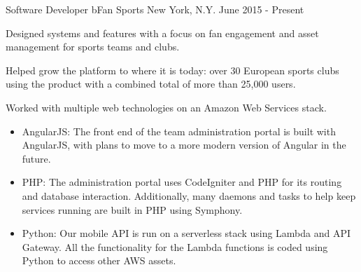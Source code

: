 

\begin{cventries}

  \cventry
    {Software Developer} %
    {bFan Sports} %
    {New York, N.Y.} %
    {June 2015 - Present} %
    {
      \begin{cvitems} %
        \item {Designed systems and features with a focus on fan engagement and asset management for sports teams and clubs.}
        \item {Helped grow the platform to where it is today: over 30 European sports clubs using the product with a combined total of more than 25,000 users.}
        \item {Worked with multiple web technologies on an Amazon Web Services stack.}
        \begin{itemize}
          \item {AngularJS: The front end of the team administration portal is built with AngularJS, with plans to move to a more modern version of Angular in the future.}
          \item {PHP: The administration portal uses CodeIgniter and PHP for its routing and database interaction. Additionally, many daemons and tasks to help keep services running are built in PHP using Symphony.}
          \item {Python: Our mobile API is run on a serverless stack using Lambda and API Gateway. All the functionality for the Lambda functions is coded using Python to access other AWS assets.}
        \end{itemize}
      \end{cvitems}
    }


\end{cventries}
